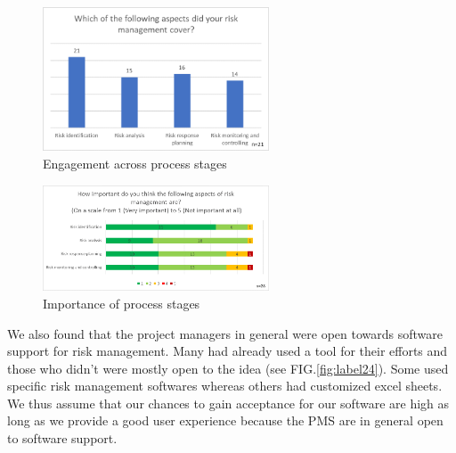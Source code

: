 \begin{figure}[H]
	\centering
	\includegraphics[width=0.6\textwidth]{Assets/survey_results/Q3.png}
	\caption{Engagement across process stages}
	\label{fig:label22}
\end{figure}
\begin{figure}[H]
	\centering
	\includegraphics[width=0.6\textwidth]{Assets/survey_results/Q4.png}
	\caption{Importance of process stages}
	\label{fig:label23}
\end{figure}

We also found that the project managers in general were open towards software support for risk management. Many had already used a tool for their efforts and those who didn't were mostly open to the idea (see FIG.\ref{fig:label24}). Some used specific risk management softwares whereas others had customized excel sheets. We thus assume that our chances to gain acceptance for our software are high as long as we provide a good user experience because the PMS are in general open to software support.

